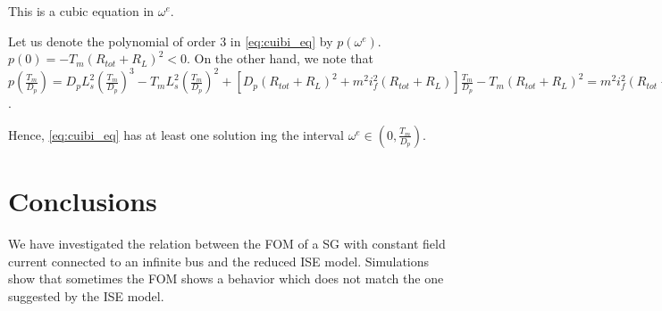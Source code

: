 \documentclass[conference]{IEEEtran}
\begin{document}
This is a cubic equation in $\omega^{e}$. 

Let us denote the polynomial of order 3 in \eqref{eq:cuibi_eq} by
$p(\omega^{e}).$ $p(0)=-T_{m}\left(R_{tot}+R_{L}\right)^{2}<0$.
On the other hand, we note that $p(\frac{T_{m}}{D_{p}})=D_{p}L_{s}^{2}\left(\frac{T_{m}}{D_{p}}\right)^{3}-T_{m}L_{s}^{2}\left(\frac{T_{m}}{D_{p}}\right)^{2}+\left[D_{p}\left(R_{tot}+R_{L}\right)^{2}+m^{2}i_{f}^{2}\left(R_{tot}+R_{L}\right)\right]\frac{T_{m}}{D_{p}}-T_{m}\left(R_{tot}+R_{L}\right)^{2}=m^{2}i_{f}^{2}\left(R_{tot}+R_{L}\right)\frac{T_{m}}{D_{p}}>0$.

Hence, \eqref{eq:cuibi_eq} has at least one solution ing the interval
$\omega^{e}\in\left(0,\frac{T_{m}}{D_{p}}\right)$.



\section{Conclusions}

We have investigated the relation between the FOM of a SG with constant
field current connected to an infinite bus and the reduced ISE model. 
Simulations show that sometimes the FOM shows a behavior which does
not match the one suggested by the ISE model. 
\end{document}
